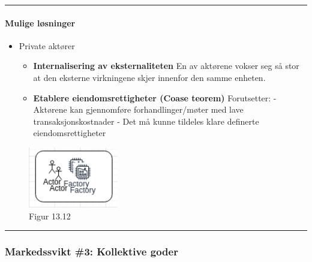 \documentclass[
  letterpaper,
  DIV=11,
  numbers=noendperiod]{scrartcl}
\let\oldparagraph\paragraph
\renewcommand{\paragraph}[1]{\oldparagraph{#1}\mbox{}}
\providecommand{\tightlist}{%
  \setlength{\itemsep}{0pt}\setlength{\parskip}{0pt}}\usepackage{longtable,booktabs,array}
\begin{document}
\begin{center}\rule{0.5\linewidth}{0.5pt}\end{center}

\paragraph{Mulige løsninger}\label{mulige-luxf8sninger-2}

\begin{itemize}
\tightlist
\item
  Private aktører

  \begin{itemize}
  \tightlist
  \item
    \textbf{Internalisering av eksternaliteten} En av aktørene vokser
    seg så stor at den eksterne virkningene skjer innenfor den samme
    enheten.
  \item
    \textbf{Etablere eiendomsrettigheter (Coase teorem)} Forutsetter: -
    Aktørene kan gjennomføre forhandlinger/møter med lave
    transaksjonskostnader - Det må kunne tildeles klare definerte
    eiendomsrettigheter
  \end{itemize}
\end{itemize}

\begin{figure}[H]

{\centering \includegraphics[width=0.35\textwidth,height=\textheight]{drawio/eks_int.png}

}

\caption{Figur 13.12}

\end{figure}%

\begin{center}\rule{0.5\linewidth}{0.5pt}\end{center}

\subsubsection{Markedssvikt \#3: Kollektive
goder}\label{markedssvikt-3-kollektive-goder}
\end{document}
